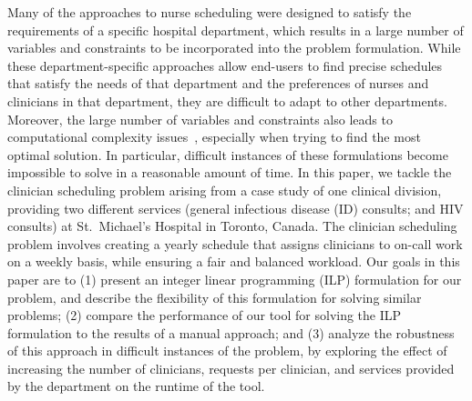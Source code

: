Many of the approaches to nurse scheduling were designed to satisfy the
requirements of a specific hospital department, which results in a large number of
variables and constraints to be incorporated into the problem formulation. While
these department-specific approaches allow end-users to find precise schedules
that satisfy the needs of that department and the preferences of nurses and
clinicians in that department, they are difficult to adapt to other
departments. %
Moreover, the large number of variables and constraints also leads to
computational complexity issues~\cite{goos_complexity_1996}, especially when
trying to find the most optimal solution. In particular, difficult instances of these formulations
become impossible to solve in a reasonable amount of time. 
In this paper, we tackle the clinician 
scheduling problem arising from a case study of one clinical
division, providing two different services (general infectious
disease (ID) consults; and HIV consults) at St.\ Michael's Hospital in
Toronto, Canada. The clinician scheduling problem involves creating
a yearly schedule that assigns clinicians to on-call work on a weekly basis,
while ensuring a fair and balanced workload.
Our goals in this paper are to (1) present an integer linear programming 
(ILP) formulation for our problem, and
describe the flexibility of this formulation for solving similar problems;
(2) compare the performance of our tool for solving the ILP formulation to the
results of a manual approach; 
and (3) analyze the robustness of this approach
in difficult instances of the problem, by exploring the effect of increasing
the number of clinicians, requests per clinician, and services provided by
the department on the runtime of the tool.

